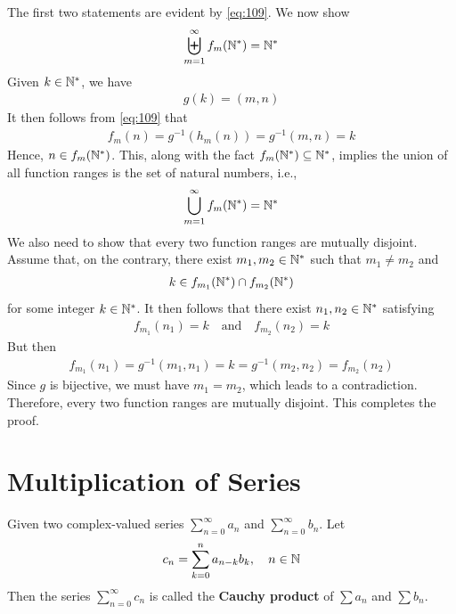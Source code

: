 \documentclass[thmcnt=section, 12pt]{my-elegantbook}
\begin{document}
\begin{solution}
    The first two statements are evident by \eqref{eq:109}. We now show 
    \begin{align*}
        \biguplus_{m=1}^\infty f_m(\mathbb{N}^\ast) = \mathbb{N}^\ast
    \end{align*}
    Given $k \in \mathbb{N}^\ast$, we have
    \begin{align*}
        g(k) = (m, n)
    \end{align*}
    It then follows from \eqref{eq:109} that 
    \begin{align*}
        f_m(n) = g^{-1}(h_m(n))
        = g^{-1}(m,n)
        = k
    \end{align*}
    Hence, $n \in f_m(\mathbb{N}^\ast)$. This, along with the fact $f_m(\mathbb{N}^\ast) \subseteq \mathbb{N}^\ast$, implies the union of all function ranges is the set of natural numbers, i.e., 
    \begin{align*}
        \bigcup_{m=1}^\infty f_m(\mathbb{N}^\ast) = \mathbb{N}^\ast
    \end{align*}
    We also need to show that every two function ranges are mutually disjoint. Assume that, on the contrary, there exist $m_1, m_2 \in \mathbb{N}^\ast$ such that $m_1 \neq m_2$ and
    \begin{align*}
        k \in f_{m_1}(\mathbb{N}^\ast) \cap f_{m_2}(\mathbb{N}^\ast)
    \end{align*}
    for some integer $k \in \mathbb{N}^\ast$. It then follows that there exist $n_1, n_2 \in \mathbb{N}^\ast$ satisfying
    \begin{align*}
        f_{m_1}(n_1) = k
        \quad \text{and} \quad
        f_{m_2}(n_2) = k
    \end{align*}
    But then
    \begin{align*}
        f_{m_1}(n_1) 
        = g^{-1}(m_1, n_1) 
        = k
        = g^{-1}(m_2, n_2)
        = f_{m_2}(n_2)
    \end{align*}
    Since $g$ is bijective, we must have $m_1 = m_2$, which leads to a contradiction. Therefore, every two function ranges are mutually disjoint. This completes the proof.
\end{solution}


\section{Multiplication of Series}

\begin{definition}
    Given two complex-valued series $\sum_{n=0}^\infty a_n$ and $\sum_{n=0}^\infty b_n$. Let 
    \begin{align*}
        c_n = \sum_{k=0}^{n} a_{n-k} b_k,
        \quad n \in \mathbb{N}
    \end{align*}
    Then the series $\sum_{n=0}^\infty c_n$ is called the \textbf{Cauchy product} of $\sum a_n$ and $\sum b_n$.
\end{definition}
\end{document}
